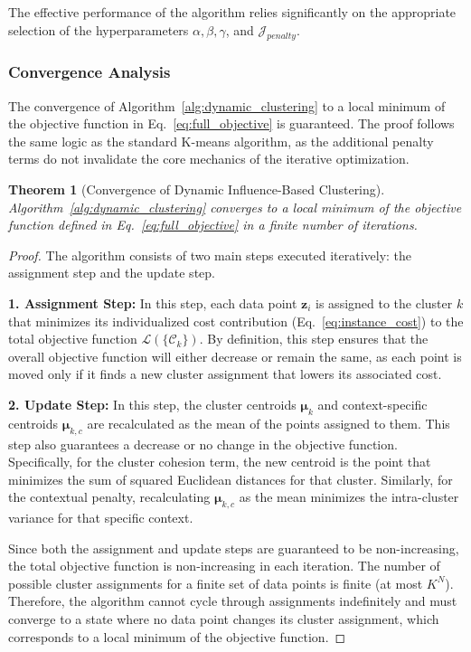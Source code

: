 \documentclass[final,authoryear,3p,times,review,sort&compress]{elsarticle}
\newtheorem{theorem}{Theorem}[section]
\newcommand{\vect}[1]{\mathbf{#1}}
\newcommand{\set}[1]{\mathcal{#1}}
\begin{document}
The effective performance of the algorithm relies significantly on the appropriate selection of the hyperparameters $\alpha, \beta, \gamma$, and $\mathcal{J}_{penalty}$.

\subsubsection{Convergence Analysis}
\label{sec:convergence_analysis}
The convergence of Algorithm~\ref{alg:dynamic_clustering} to a local minimum of the objective function in Eq.~\ref{eq:full_objective} is guaranteed. The proof follows the same logic as the standard K-means algorithm, as the additional penalty terms do not invalidate the core mechanics of the iterative optimization.

\begin{theorem}[Convergence of Dynamic Influence-Based Clustering]
Algorithm~\ref{alg:dynamic_clustering} converges to a local minimum of the objective function defined in Eq.~\ref{eq:full_objective} in a finite number of iterations.
\end{theorem}

\begin{proof}
The algorithm consists of two main steps executed iteratively: the assignment step and the update step.

\textbf{1. Assignment Step:} In this step, each data point $\vect{z}_i$ is assigned to the cluster $k$ that minimizes its individualized cost contribution (Eq.~\ref{eq:instance_cost}) to the total objective function $\mathcal{L}(\{\set{C}_k\})$. By definition, this step ensures that the overall objective function will either decrease or remain the same, as each point is moved only if it finds a new cluster assignment that lowers its associated cost.

\textbf{2. Update Step:} In this step, the cluster centroids $\boldsymbol{\mu}_k$ and context-specific centroids $\boldsymbol{\mu}_{k,c}$ are recalculated as the mean of the points assigned to them. This step also guarantees a decrease or no change in the objective function. Specifically, for the cluster cohesion term, the new centroid is the point that minimizes the sum of squared Euclidean distances for that cluster. Similarly, for the contextual penalty, recalculating $\boldsymbol{\mu}_{k,c}$ as the mean minimizes the intra-cluster variance for that specific context.

Since both the assignment and update steps are guaranteed to be non-increasing, the total objective function is non-increasing in each iteration. The number of possible cluster assignments for a finite set of data points is finite (at most $K^N$). Therefore, the algorithm cannot cycle through assignments indefinitely and must converge to a state where no data point changes its cluster assignment, which corresponds to a local minimum of the objective function.
\end{proof}
\end{document}
